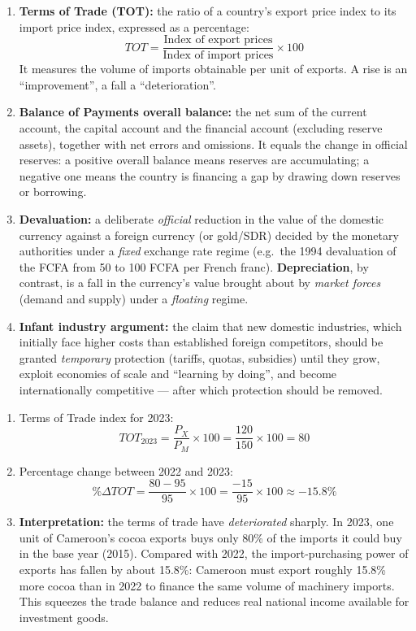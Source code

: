 \documentclass[11pt]{article}
\begin{document}
\begin{corrige}
\begin{enumerate}
\item \textbf{Terms of Trade (TOT):} the ratio of a country's export price index to its import price index, expressed as a percentage:
\[ TOT = \frac{\text{Index of export prices}}{\text{Index of import prices}}\times 100 \]
It measures the volume of imports obtainable per unit of exports. A rise is an ``improvement'', a fall a ``deterioration''.
\item \textbf{Balance of Payments overall balance:} the net sum of the current account, the capital account and the financial account (excluding reserve assets), together with net errors and omissions. It equals the change in official reserves: a positive overall balance means reserves are accumulating; a negative one means the country is financing a gap by drawing down reserves or borrowing.
\item \textbf{Devaluation:} a deliberate \emph{official} reduction in the value of the domestic currency against a foreign currency (or gold/SDR) decided by the monetary authorities under a \emph{fixed} exchange rate regime (e.g.\ the 1994 devaluation of the FCFA from 50 to 100 FCFA per French franc). \textbf{Depreciation}, by contrast, is a fall in the currency's value brought about by \emph{market forces} (demand and supply) under a \emph{floating} regime.
\item \textbf{Infant industry argument:} the claim that new domestic industries, which initially face higher costs than established foreign competitors, should be granted \emph{temporary} protection (tariffs, quotas, subsidies) until they grow, exploit economies of scale and ``learning by doing'', and become internationally competitive — after which protection should be removed.
\end{enumerate}
\end{corrige}

\begin{corrige}
\begin{enumerate}
\item Terms of Trade index for 2023:
\[ TOT_{2023} = \frac{P_X}{P_M}\times 100 = \frac{120}{150}\times 100 = \boxed{80} \]
\item Percentage change between 2022 and 2023:
\[ \%\Delta TOT = \frac{80 - 95}{95}\times 100 = \frac{-15}{95}\times 100 \approx \boxed{-15.8\%} \]
\item \textbf{Interpretation:} the terms of trade have \emph{deteriorated} sharply. In 2023, one unit of Cameroon's cocoa exports buys only 80\% of the imports it could buy in the base year (2015). Compared with 2022, the import-purchasing power of exports has fallen by about 15.8\%: Cameroon must export roughly 15.8\% more cocoa than in 2022 to finance the same volume of machinery imports. This squeezes the trade balance and reduces real national income available for investment goods.
\end{enumerate}
\end{corrige}
\end{document}
